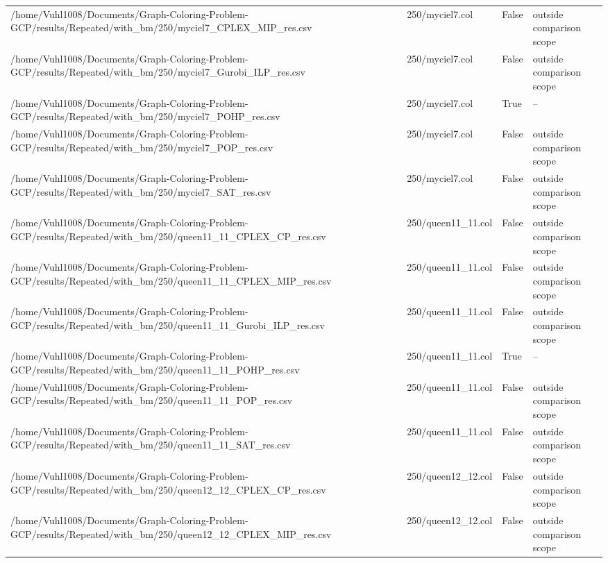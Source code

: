 \begin{table}[htbp]
\begin{tabular}{llll}
/home/Vuhl1008/Documents/Graph-Coloring-Problem-GCP/results/Repeated/with\_bm/250/myciel7\_CPLEX\_MIP\_res.csv & 250/myciel7.col & False & outside comparison scope \\
/home/Vuhl1008/Documents/Graph-Coloring-Problem-GCP/results/Repeated/with\_bm/250/myciel7\_Gurobi\_ILP\_res.csv & 250/myciel7.col & False & outside comparison scope \\
/home/Vuhl1008/Documents/Graph-Coloring-Problem-GCP/results/Repeated/with\_bm/250/myciel7\_POHP\_res.csv & 250/myciel7.col & True & -- \\
/home/Vuhl1008/Documents/Graph-Coloring-Problem-GCP/results/Repeated/with\_bm/250/myciel7\_POP\_res.csv & 250/myciel7.col & False & outside comparison scope \\
/home/Vuhl1008/Documents/Graph-Coloring-Problem-GCP/results/Repeated/with\_bm/250/myciel7\_SAT\_res.csv & 250/myciel7.col & False & outside comparison scope \\
/home/Vuhl1008/Documents/Graph-Coloring-Problem-GCP/results/Repeated/with\_bm/250/queen11\_11\_CPLEX\_CP\_res.csv & 250/queen11\_11.col & False & outside comparison scope \\
/home/Vuhl1008/Documents/Graph-Coloring-Problem-GCP/results/Repeated/with\_bm/250/queen11\_11\_CPLEX\_MIP\_res.csv & 250/queen11\_11.col & False & outside comparison scope \\
/home/Vuhl1008/Documents/Graph-Coloring-Problem-GCP/results/Repeated/with\_bm/250/queen11\_11\_Gurobi\_ILP\_res.csv & 250/queen11\_11.col & False & outside comparison scope \\
/home/Vuhl1008/Documents/Graph-Coloring-Problem-GCP/results/Repeated/with\_bm/250/queen11\_11\_POHP\_res.csv & 250/queen11\_11.col & True & -- \\
/home/Vuhl1008/Documents/Graph-Coloring-Problem-GCP/results/Repeated/with\_bm/250/queen11\_11\_POP\_res.csv & 250/queen11\_11.col & False & outside comparison scope \\
/home/Vuhl1008/Documents/Graph-Coloring-Problem-GCP/results/Repeated/with\_bm/250/queen11\_11\_SAT\_res.csv & 250/queen11\_11.col & False & outside comparison scope \\
/home/Vuhl1008/Documents/Graph-Coloring-Problem-GCP/results/Repeated/with\_bm/250/queen12\_12\_CPLEX\_CP\_res.csv & 250/queen12\_12.col & False & outside comparison scope \\
/home/Vuhl1008/Documents/Graph-Coloring-Problem-GCP/results/Repeated/with\_bm/250/queen12\_12\_CPLEX\_MIP\_res.csv & 250/queen12\_12.col & False & outside comparison scope \\

\end{tabular}
\end{table}
